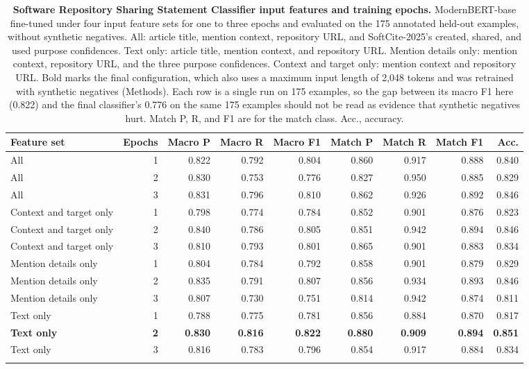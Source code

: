\documentclass[pdflatex,sn-nature]{sn-jnl}%
\begin{document}
\begin{table}[p]
\caption{\textbf{Software Repository Sharing Statement Classifier input features and training epochs.} ModernBERT-base fine-tuned under four input feature sets for one to three epochs and evaluated on the 175 annotated held-out examples, without synthetic negatives. All: article title, mention context, repository URL, and SoftCite-2025's created, shared, and used purpose confidences. Text only: article title, mention context, and repository URL. Mention details only: mention context, repository URL, and the three purpose confidences. Context and target only: mention context and repository URL. Bold marks the final configuration, which also uses a maximum input length of 2,048 tokens and was retrained with synthetic negatives (Methods). Each row is a single run on 175 examples, so the gap between its macro F1 here (0.822) and the final classifier's 0.776 on the same 175 examples should not be read as evidence that synthetic negatives hurt. Match P, R, and F1 are for the match class. Acc., accuracy.}\label{stab:softcitegrid}
\footnotesize
\setlength{\tabcolsep}{3pt}
\begin{tabular}{@{}lrrrrrrrr@{}}
\toprule
Feature set & Epochs & Macro P & Macro R & Macro F1 & Match P & Match R & Match F1 & Acc. \\
\midrule
All & 1 & 0.822 & 0.792 & 0.804 & 0.860 & 0.917 & 0.888 & 0.840 \\
All & 2 & 0.830 & 0.753 & 0.776 & 0.827 & 0.950 & 0.885 & 0.829 \\
All & 3 & 0.831 & 0.796 & 0.810 & 0.862 & 0.926 & 0.892 & 0.846 \\
\addlinespace
Context and target only & 1 & 0.798 & 0.774 & 0.784 & 0.852 & 0.901 & 0.876 & 0.823 \\
Context and target only & 2 & 0.840 & 0.786 & 0.805 & 0.851 & 0.942 & 0.894 & 0.846 \\
Context and target only & 3 & 0.810 & 0.793 & 0.801 & 0.865 & 0.901 & 0.883 & 0.834 \\
\addlinespace
Mention details only & 1 & 0.804 & 0.784 & 0.792 & 0.858 & 0.901 & 0.879 & 0.829 \\
Mention details only & 2 & 0.835 & 0.791 & 0.807 & 0.856 & 0.934 & 0.893 & 0.846 \\
Mention details only & 3 & 0.807 & 0.730 & 0.751 & 0.814 & 0.942 & 0.874 & 0.811 \\
\addlinespace
Text only & 1 & 0.788 & 0.775 & 0.781 & 0.856 & 0.884 & 0.870 & 0.817 \\
\textbf{Text only} & \textbf{2} & \textbf{0.830} & \textbf{0.816} & \textbf{0.822} & \textbf{0.880} & \textbf{0.909} & \textbf{0.894} & \textbf{0.851} \\
Text only & 3 & 0.816 & 0.783 & 0.796 & 0.854 & 0.917 & 0.884 & 0.834 \\
\botrule
\end{tabular}
\end{table}
\end{document}
